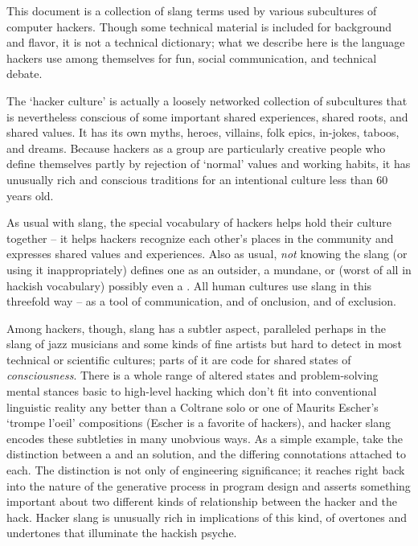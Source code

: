 This document is a collection of slang terms used by various subcultures of computer hackers. Though some technical material is
included for background and flavor, it is not a technical dictionary; what we describe here is the language hackers use among
themselves for fun, social communication, and technical debate.

The `hacker culture' is actually a loosely networked collection of subcultures that is nevertheless conscious of some important shared
experiences, shared roots, and shared values. It has its own myths, heroes, villains, folk epics, in-jokes, taboos, and dreams. Because
hackers as a group are particularly creative people who define themselves partly by rejection of `normal' values and working habits, it
has unusually rich and conscious traditions for an intentional culture less than 60 years old.

As usual with slang, the special vocabulary of hackers helps hold their culture together -- it helps hackers recognize each other's
places in the community and expresses shared values and experiences. Also as usual, \textit{not} knowing the slang (or using it
inappropriately) defines one as an outsider, a mundane, or (worst of all in hackish vocabulary) possibly even a . All
human cultures use slang in this threefold way -- as a tool of communication, and of onclusion, and of exclusion.

Among hackers, though, slang has a subtler aspect, paralleled perhaps in the slang of jazz musicians and some kinds of fine artists but
hard to detect in most technical or scientific cultures; parts of it are code for shared states of \textit{consciousness}. There is a
whole range of altered states and problem-solving mental stances basic to high-level hacking which don't fit into conventional
linguistic reality any better than a Coltrane solo or one of Maurits Escher's `trompe l'oeil' compositions (Escher is a favorite of
hackers), and hacker slang encodes these subtleties in many unobvious ways. As a simple example, take the distinction between a
 and an  solution, and the differing connotations attached to each. The distinction is not only of
engineering significance; it reaches right back into the nature of the generative process in program design and asserts something
important about two different kinds of relationship between the hacker and the hack. Hacker slang is unusually rich in implications of
this kind, of overtones and undertones that illuminate the hackish psyche.

